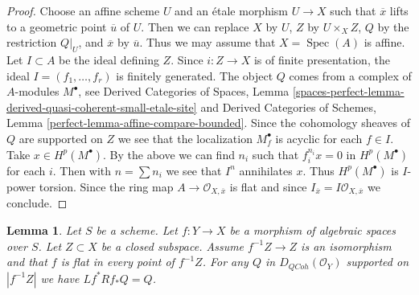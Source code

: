 \documentclass{stacks-project}
\theoremstyle{plain}
\newtheorem{lemma}[subsection]{Lemma}
\theoremstyle{definition}
\theoremstyle{remark}
\numberwithin{equation}{subsection}
\def\Spec{\mathop{\mathrm{Spec}}}
\def\QCoh{\mathit{QCoh}}
\begin{document}
\begin{proof}
Choose an affine scheme $U$ and an \'etale morphism $U \to X$ such
that $\overline{x}$ lifts to a geometric point $\overline{u}$
of $U$. Then we can replace $X$ by $U$, $Z$ by $U \times_X Z$,
$Q$ by the restriction $Q|_U$, and $\overline{x}$ by $\overline{u}$.
Thus we may assume that $X = \Spec(A)$ is affine. Let $I \subset A$
be the ideal defining $Z$. Since $i : Z \to X$ is of finite presentation,
the ideal $I = (f_1, \ldots, f_r)$ is finitely generated.
The object $Q$ comes from a complex of $A$-modules $M^\bullet$, see
Derived Categories of Spaces, Lemma
\ref{spaces-perfect-lemma-derived-quasi-coherent-small-etale-site}
and
Derived Categories of Schemes, Lemma
\ref{perfect-lemma-affine-compare-bounded}.
Since the cohomology sheaves of $Q$ are supported on $Z$
we see that the localization $M^\bullet_f$ is acyclic for each $f \in I$.
Take $x \in H^p(M^\bullet)$. By the above we can find $n_i$ such
that $f_i^{n_i} x = 0$ in $H^p(M^\bullet)$ for each $i$.
Then with $n = \sum n_i$ we see that $I^n$ annihilates $x$.
Thus $H^p(M^\bullet)$ is $I$-power torsion. Since the ring
map $A \to \mathcal{O}_{X, \overline{x}}$ is flat and since
$I_{\overline{x}} = I\mathcal{O}_{X, \overline{x}}$ we conclude.
\end{proof}

\begin{lemma}
\label{lemma-formal-glueing-on-closed}
Let $S$ be a scheme. Let $f : Y \to X$ be a morphism of algebraic spaces
over $S$. Let $Z \subset X$ be a closed subspace. Assume $f^{-1}Z \to Z$
is an isomorphism and that $f$ is flat in every point of $f^{-1}Z$. For any
$Q$ in $D_\QCoh(\mathcal{O}_Y)$ supported on $|f^{-1}Z|$ we have
$Lf^*Rf_*Q = Q$.
\end{lemma}
\end{document}
